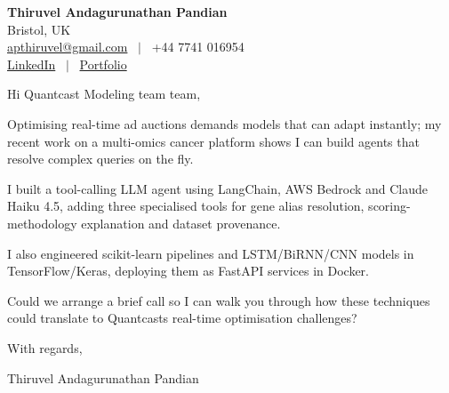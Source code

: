 \documentclass[11pt,a4paper]{article}
\begin{document}
\raggedright
\pagestyle{empty}

\begin{center}
    {\LARGE \color{linkblue} \textbf{Thiruvel Andagurunathan Pandian}}\\[0.2cm]
    Bristol, UK \\
    \href{mailto:apthiruvel@gmail.com}{apthiruvel@gmail.com} \ $|$ \ +44 7741 016954 \\
\href{https://www.linkedin.com/in/thiruvel-a-p/}{LinkedIn} \ $|$ \ \href{https://thiruvel-ap.github.io/PersonalPortfolio/}{Portfolio}
\end{center}

\vspace{0.4cm}

\noindent
Hi Quantcast Modeling team team,

Optimising real-time ad auctions demands models that can adapt instantly; my recent work on a multi-omics cancer platform shows I can build agents that resolve complex queries on the fly.

I built a tool-calling LLM agent using LangChain, AWS Bedrock and Claude Haiku 4.5, adding three specialised tools for gene alias resolution, scoring-methodology explanation and dataset provenance.

I also engineered scikit-learn pipelines and LSTM/BiRNN/CNN models in TensorFlow/Keras, deploying them as FastAPI services in Docker.

Could we arrange a brief call so I can walk you through how these techniques could translate to Quantcast\textquotesingle{}s real-time optimisation challenges?

\vspace{0.5cm}

With regards,

Thiruvel Andagurunathan Pandian
\end{document}
